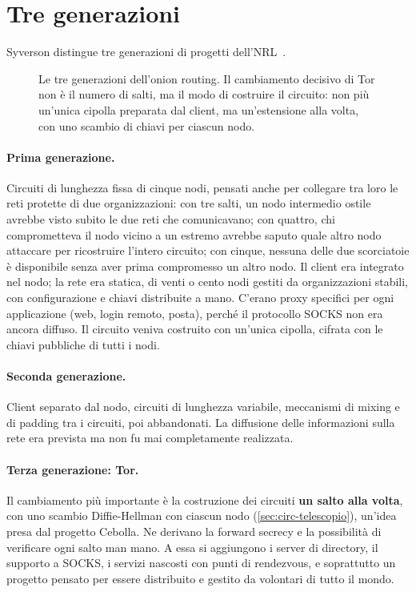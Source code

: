 \section{Tre generazioni}\label{sec:nascita-generazioni}

Syverson distingue tre generazioni di progetti dell'NRL~\cite{syverson2011peel}.

\begin{figure}[htbp]
\centering

\caption{Le tre generazioni dell'onion routing. Il cambiamento decisivo di Tor non è il numero di salti, ma il modo di costruire il circuito: non più un'unica cipolla preparata dal client, ma un'estensione alla volta, con uno scambio di chiavi per ciascun nodo.}
\label{fig:generazioni}
\end{figure}

\paragraph{Prima generazione.} Circuiti di lunghezza fissa di cinque nodi, pensati anche per collegare tra loro le reti protette di due organizzazioni: con tre salti, un nodo intermedio ostile avrebbe visto subito le due reti che comunicavano; con quattro, chi comprometteva il nodo vicino a un estremo avrebbe saputo quale altro nodo attaccare per ricostruire l'intero circuito; con cinque, nessuna delle due scorciatoie è disponibile senza aver prima compromesso un altro nodo. Il client era integrato nel nodo; la rete era statica, di venti o cento nodi gestiti da organizzazioni stabili, con configurazione e chiavi distribuite a mano. C'erano proxy specifici per ogni applicazione (web, login remoto, posta), perché il protocollo SOCKS non era ancora diffuso. Il circuito veniva costruito con un'unica cipolla, cifrata con le chiavi pubbliche di tutti i nodi.

\paragraph{Seconda generazione.} Client separato dal nodo, circuiti di lunghezza variabile, meccanismi di mixing e di padding tra i circuiti, poi abbandonati. La diffusione delle informazioni sulla rete era prevista ma non fu mai completamente realizzata.

\paragraph{Terza generazione: Tor.} Il cambiamento più importante è la costruzione dei circuiti \textbf{un salto alla volta}, con uno scambio Diffie-Hellman con ciascun nodo (\cref{sec:circ-telescopio}), un'idea presa dal progetto Cebolla. Ne derivano la forward secrecy e la possibilità di verificare ogni salto man mano. A essa si aggiungono i server di directory, il supporto a SOCKS, i servizi nascosti con punti di rendezvous, e soprattutto un progetto pensato per essere distribuito e gestito da volontari di tutto il mondo.

